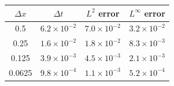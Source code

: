 \begin{tabular}{cccc}
\toprule
$\Delta x$ & $\Delta t$ & $L^2$ error & $L^\infty$ error \\
\midrule
0.5 & $6.2\times 10^{-2}$ & $7.0\times 10^{-2}$ & $3.2\times 10^{-2}$ \\
0.25 & $1.6\times 10^{-2}$ & $1.8\times 10^{-2}$ & $8.3\times 10^{-3}$ \\
0.125 & $3.9\times 10^{-3}$ & $4.5\times 10^{-3}$ & $2.1\times 10^{-3}$ \\
0.0625 & $9.8\times 10^{-4}$ & $1.1\times 10^{-3}$ & $5.2\times 10^{-4}$ \\
\bottomrule
\end{tabular}
